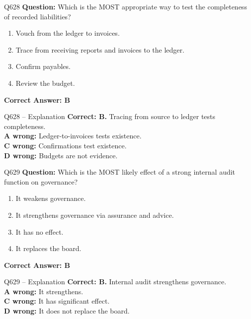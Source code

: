 \documentclass[aspectratio=169,10pt]{beamer}
\begin{document}
	\begin{frame}[t]{Q628}
		\small
		\textbf{Question:} Which is the MOST appropriate way to test the completeness of recorded liabilities?
		\begin{enumerate}[label=\Alph*.,itemsep=1pt,topsep=2pt]
			\item Vouch from the ledger to invoices.
			\item Trace from receiving reports and invoices to the ledger.
			\item Confirm payables.
			\item Review the budget.
		\end{enumerate}
		\vspace{4pt}
		\textbf{Correct Answer: B}
	\end{frame}
	
	\begin{frame}[t]{Q628 -- Explanation}
		\small
		\textbf{Correct: B.} Tracing from source to ledger tests completeness. \\[4pt]
		\textbf{A wrong:} Ledger-to-invoices tests existence. \\[2pt]
		\textbf{C wrong:} Confirmations test existence. \\[2pt]
		\textbf{D wrong:} Budgets are not evidence.
	\end{frame}
	
	\begin{frame}[t]{Q629}
		\small
		\textbf{Question:} Which is the MOST likely effect of a strong internal audit function on governance?
		\begin{enumerate}[label=\Alph*.,itemsep=1pt,topsep=2pt]
			\item It weakens governance.
			\item It strengthens governance via assurance and advice.
			\item It has no effect.
			\item It replaces the board.
		\end{enumerate}
		\vspace{4pt}
		\textbf{Correct Answer: B}
	\end{frame}
	
	\begin{frame}[t]{Q629 -- Explanation}
		\small
		\textbf{Correct: B.} Internal audit strengthens governance. \\[4pt]
		\textbf{A wrong:} It strengthens. \\[2pt]
		\textbf{C wrong:} It has significant effect. \\[2pt]
		\textbf{D wrong:} It does not replace the board.
	\end{frame}
	
\end{document}
